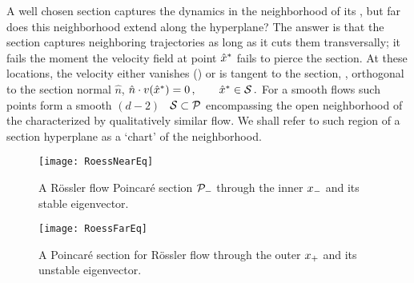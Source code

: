 A well chosen section captures the dynamics in the neighborhood of its
\template, but far does this neighborhood extend along the hyperplane?
The answer is that the section captures neighboring trajectories as long
as it cuts them transversally; it fails the moment the velocity field at
point $\hat{x}^\ast$ fails to pierce the section. At these locations, the
velocity either vanishes (\eqv) or is tangent to the section, \ie,
orthogonal to the section normal $\hat{n}$,
\(
    \hat{n} \cdot v(\hat{x}^\ast) = 0
\,,\qquad
    \hat{x}^\ast \in \cal{S}
\,.
\) %
For a smooth flows such points form a smooth $(d\!-\!2)$\dmn\ \emph{\poincBord} ${\cal S} \subset {\cal P}$
encompassing the open neighborhood of the {\template} characterized by
qualitatively similar flow. We shall refer to such region of a section hyperplane
as a `chart' of the {\template} neighborhood.


\begin{figure}%
\begin{center}
  \texttt{[image: RoessNearEq]}
\end{center}
  \caption{\label{fig:RoessNearEq}
  A R\"ossler flow Poincar\'e section ${\cal P}_{-}$ through the inner
  {\eqv} $x_{-}$ and its stable eigenvector.
}
\end{figure}

\begin{figure}%
\begin{center}
  \texttt{[image: RoessFarEq]}
\end{center}
  \caption[R\"ossler section, outer {\eqv}]{
  A Poincar\'e section for R\"ossler flow
      through the
      outer
  {\eqv} $x_{+}$  and its unstable eigenvector.
  } \label{fig:RoessFarEq}
\end{figure}


